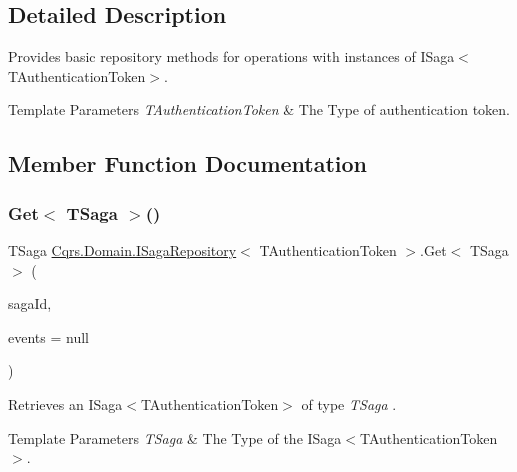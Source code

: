 \subsection{Detailed Description}
Provides basic repository methods for operations with instances of I\+Saga$<$\+T\+Authentication\+Token$>$. 


\begin{DoxyTemplParams}{Template Parameters}
{\em T\+Authentication\+Token} & The Type of authentication token.\\
\hline
\end{DoxyTemplParams}


\subsection{Member Function Documentation}
\mbox{\label{interfaceCqrs_1_1Domain_1_1ISagaRepository_aa3409bf59bbe489afcc89716928e9ad1_aa3409bf59bbe489afcc89716928e9ad1}} 
\subsubsection{\texorpdfstring{Get$<$ T\+Saga $>$()}{Get< TSaga >()}}
{\footnotesize\ttfamily T\+Saga \hyperlink{interfaceCqrs_1_1Domain_1_1ISagaRepository}{Cqrs.\+Domain.\+I\+Saga\+Repository}$<$ T\+Authentication\+Token $>$.Get$<$ T\+Saga $>$ (\begin{DoxyParamCaption}\item[{Guid}]{saga\+Id,  }\item[{I\+List$<$ \hyperlink{interfaceCqrs_1_1Events_1_1ISagaEvent}{I\+Saga\+Event}$<$ T\+Authentication\+Token $>$$>$}]{events = {\ttfamily null} }\end{DoxyParamCaption})}



Retrieves an I\+Saga$<$\+T\+Authentication\+Token$>$ of type {\itshape T\+Saga} . 


\begin{DoxyTemplParams}{Template Parameters}
{\em T\+Saga} & The Type of the I\+Saga$<$\+T\+Authentication\+Token$>$.\\
\hline
\end{DoxyTemplParams}

